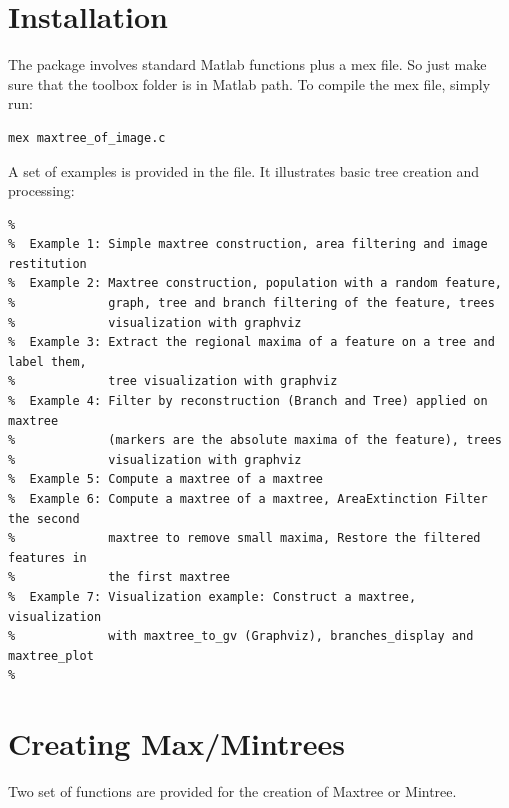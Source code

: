 \documentclass[DIV=calc, paper=a4, fontsize=11pt]{scrartcl}	 %
\begin{document}

\section{Installation}
The package involves standard  Matlab functions plus a mex file. So just make sure that the toolbox folder is in Matlab path. To compile the mex file, simply run:

\begin{lstlisting}[aboveskip=0.5 \baselineskip]
mex maxtree_of_image.c
\end{lstlisting}
 
 A set of examples is provided in the  file. It illustrates basic tree creation and processing: 
 \begin{lstlisting}[aboveskip=0.5 \baselineskip]
%  Examples of function use of the maxtree Toolbox
%
%  Example 1: Simple maxtree construction, area filtering and image restitution 
%  Example 2: Maxtree construction, population with a random feature,
%             graph, tree and branch filtering of the feature, trees 
%             visualization with graphviz
%  Example 3: Extract the regional maxima of a feature on a tree and label them, 
%             tree visualization with graphviz
%  Example 4: Filter by reconstruction (Branch and Tree) applied on maxtree 
%             (markers are the absolute maxima of the feature), trees 
%             visualization with graphviz
%  Example 5: Compute a maxtree of a maxtree
%  Example 6: Compute a maxtree of a maxtree, AreaExtinction Filter the second 
%             maxtree to remove small maxima, Restore the filtered features in 
%             the first maxtree
%  Example 7: Visualization example: Construct a maxtree, visualization 
%             with maxtree_to_gv (Graphviz), branches_display and maxtree_plot 
%
\end{lstlisting}
 


\section{Creating Max/Mintrees}
Two set of functions are provided for the creation of Maxtree or Mintree.
\end{document}
